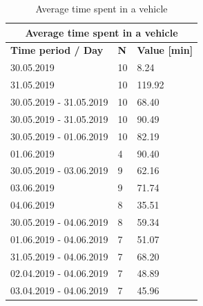 \begin{table}[]
\begin{tabular}{|l|l|l|}
\hline
\multicolumn{3}{|c|}{\textbf{Average time spent in a vehicle}}     \\ \hline
\textbf{Time period / Day} & \textbf{N} & \textbf{Value {[}min{]}} \\ \hline
30.05.2019                 & 10         & 8.24                     \\ \hline
31.05.2019                 & 10         & 119.92                   \\ \hline
30.05.2019 - 31.05.2019    & 10         & 68.40                    \\ \hline
30.05.2019 - 31.05.2019    & 10         & 90.49                    \\ \hline
30.05.2019 - 01.06.2019    & 10         & 82.19                    \\ \hline
01.06.2019                 & 4          & 90.40                    \\ \hline
30.05.2019 - 03.06.2019    & 9          & 62.16                    \\ \hline
03.06.2019                 & 9          & 71.74                    \\ \hline
04.06.2019                 & 8          & 35.51                    \\ \hline
30.05.2019 - 04.06.2019    & 8          & 59.34                    \\ \hline
01.06.2019 - 04.06.2019    & 7          & 51.07                    \\ \hline
31.05.2019 - 04.06.2019    & 7          & 68.20                    \\ \hline
02.04.2019 - 04.06.2019    & 7          & 48.89                    \\ \hline
03.04.2019 - 04.06.2019    & 7          & 45.96                    \\ \hline
\end{tabular}
\label{results-vehicle}
\caption{Average time spent in a vehicle}
\end{table}

